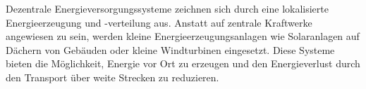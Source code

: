 Dezentrale Energieversorgungssysteme zeichnen sich durch eine lokalisierte
Energieerzeugung und -verteilung aus. Anstatt auf zentrale Kraftwerke
angewiesen zu sein, werden kleine Energieerzeugungsanlagen wie Solaranlagen auf
Dächern von Gebäuden oder kleine Windturbinen eingesetzt. Diese Systeme bieten
die Möglichkeit, Energie vor Ort zu erzeugen und den Energieverlust durch den
Transport über weite Strecken zu reduzieren.